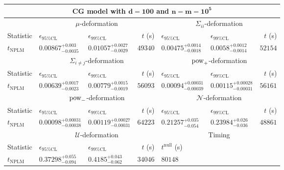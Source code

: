 \begin{tabular}{l|llr|llr}
	\toprule
	\multicolumn{7}{c}{{\bf CG model with $\mathbf{d=100}$ and $\mathbf{n=m=10^{5}}$}} \\
	\toprule
	\multicolumn{1}{c}{} & \multicolumn{3}{c}{$\mu$-deformation} & \multicolumn{3}{c}{$\Sigma_{ii}$-deformation} \\
	Statistic & $\epsilon_{95\%\mathrm{CL}}$ & $\epsilon_{99\%\mathrm{CL}}$ & $t$ (s) & $\epsilon_{95\%\mathrm{CL}}$ & $\epsilon_{99\%\mathrm{CL}}$ & $t$ (s) \\
	\midrule
	$t_{\mathrm{NPLM}}$ & $0.00867_{-0.0035}^{+0.003}$ & $0.01057_{-0.0029}^{+0.0027}$ & $49340$ & $0.00475_{-0.0018}^{+0.0014}$ & $0.0058_{-0.0014}^{+0.0012}$ & $52154$ \\
	\toprule
	\multicolumn{1}{c}{} & \multicolumn{3}{c}{$\Sigma_{i\neq j}$-deformation} & \multicolumn{3}{c}{$\rm{pow}_{+}$-deformation} \\
	Statistic & $\epsilon_{95\%\mathrm{CL}}$ & $\epsilon_{99\%\mathrm{CL}}$ & $t$ (s) & $\epsilon_{95\%\mathrm{CL}}$ & $\epsilon_{99\%\mathrm{CL}}$ & $t$ (s) \\
	\midrule
	$t_{\mathrm{NPLM}}$ & $0.00639_{-0.0023}^{+0.0017}$ & $0.00779_{-0.0019}^{+0.0015}$ & $56093$ & $0.00094_{-0.00039}^{+0.00031}$ & $0.00115_{-0.00031}^{+0.00028}$ & $56161$ \\
	\toprule
	\multicolumn{1}{c}{} & \multicolumn{3}{c}{$\rm{pow}_{-}$-deformation} & \multicolumn{3}{c}{$\mathcal{N}$-deformation} \\
	Statistic & $\epsilon_{95\%\mathrm{CL}}$ & $\epsilon_{99\%\mathrm{CL}}$ & $t$ (s) & $\epsilon_{95\%\mathrm{CL}}$ & $\epsilon_{99\%\mathrm{CL}}$ & $t$ (s) \\
	\midrule
	$t_{\mathrm{NPLM}}$ & $0.00098_{-0.00038}^{+0.00031}$ & $0.00119_{-0.00031}^{+0.00027}$ & $64223$ & $0.21257_{-0.054}^{+0.035}$ & $0.23984_{-0.036}^{+0.026}$ & $48861$ \\
	\toprule
	\multicolumn{1}{c}{} & \multicolumn{3}{c}{$\mathcal{U}$-deformation} & \multicolumn{3}{c}{Timing} \\
	Statistic & $\epsilon_{95\%\mathrm{CL}}$ & $\epsilon_{99\%\mathrm{CL}}$ & $t$ (s) & $t^{\mathrm{null}}$ (s) \\
	\midrule
	$t_{\mathrm{NPLM}}$ & $0.37298_{-0.094}^{+0.055}$ & $0.4185_{-0.062}^{+0.043}$ & $34046$ & $80148$ \\
	\bottomrule
\end{tabular}